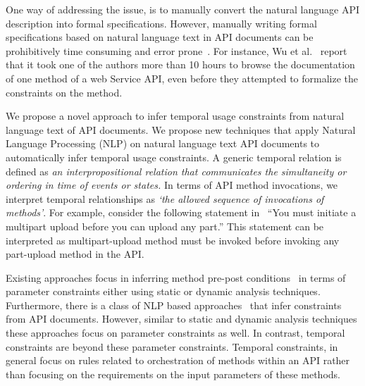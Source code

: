 One way of addressing the issue, is to manually convert the natural language API description into formal specifications. 
However, manually writing formal specifications based on natural language text in API documents can be prohibitively time consuming and error prone~\cite{wu2013inferring,RubingerWEB10}. 
For instance, Wu et al.~\cite{wu2013inferring} report that it took one of the authors more than 10 hours to browse the documentation of one method of a web Service API, even before they attempted to formalize the constraints on the method.

We propose a novel approach to infer temporal usage constraints from natural language text of API documents. We propose new techniques that apply Natural Language Processing (NLP) on natural language text API documents to automatically infer temporal usage constraints. 
A generic temporal relation is defined as \textit{an interpropositional relation that communicates the simultaneity or ordering in time of events or states.}
In terms of API method invocations, we interpret temporal relationships as \textit{`the allowed sequence of invocations of methods'}.
For example, consider the following statement in \amazonAPI\ ``You must initiate a multipart upload before you can upload any part.''
This statement can be interpreted as multipart-upload method must be invoked before invoking any part-upload method in the API.




Existing approaches focus in inferring method pre-post conditions~\cite{Henkel07discoveringdocumentation,Ghezzi:2009:SIB:1555001.1555057,Henkel:2008:DDA:1363102.1363105,Flanagan:2001:HAA:647540.730008,Buse:2008:ADI:1390630.1390664} in terms of parameter constraints either using static or dynamic analysis techniques.
Furthermore, there is a class of NLP based approaches~\cite{pandita12:inferring, wu2013inferring} that infer constraints from API documents.
However, similar to static and dynamic analysis techniques these approaches focus on parameter constraints as well.  
In contrast, temporal constraints are beyond these parameter constraints.
Temporal constraints, in general focus on rules related to orchestration of methods within an API rather than focusing on the requirements on the input parameters of these methods.   

